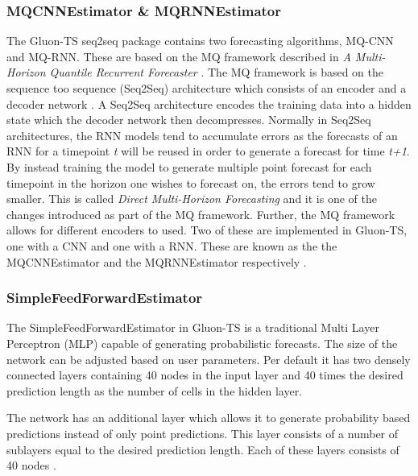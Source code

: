 \subsubsection{MQCNNEstimator \& MQRNNEstimator}
The Gluon-TS seq2seq package contains two forecasting algorithms, MQ-CNN and MQ-RNN. These are based on the MQ framework described in \textit{A Multi-Horizon Quantile Recurrent Forecaster} \cite{wen_multi-horizon_2018}. The MQ framework is based on the sequence too sequence (Seq2Seq) architecture  which consists of an encoder and a decoder network \cite{seq2seq}. A Seq2Seq architecture encodes the training data into a hidden state which the decoder network then decompresses. Normally in Seq2Seq architectures, the RNN models tend to accumulate errors as the forecasts of an RNN for a timepoint \textit{t} will be reused in order to generate a forecast for time \textit{t+1}. By instead training the model to generate multiple point forecast for each timepoint in the horizon one wishes to forecast on, the errors tend to grow smaller. This is called \textit{Direct Multi-Horizon Forecasting} and it is one of the changes introduced as part of the MQ framework. Further, the MQ framework allows for different encoders to used. Two of these are implemented in Gluon-TS, one with a CNN and one with a RNN. These are known as the the MQCNNEstimator and the MQRNNEstimator respectively \cite{gluonts-website}.

\subsubsection{SimpleFeedForwardEstimator}
\label{algo:simplefeedforward}
The SimpleFeedForwardEstimator in Gluon-TS is a traditional Multi Layer Perceptron (MLP) capable of generating probabilistic forecasts. The size of the network can be adjusted based on user parameters. Per default it has two densely connected layers containing 40 nodes in the input layer and 40 times the desired prediction length as the number of cells in the hidden layer.

The network has an additional layer which allows it to generate probability based predictions instead of only point predictions. This layer consists of a number of sublayers equal to the desired prediction length. Each of these layers consists of 40 nodes \cite{gluonts-github}.

